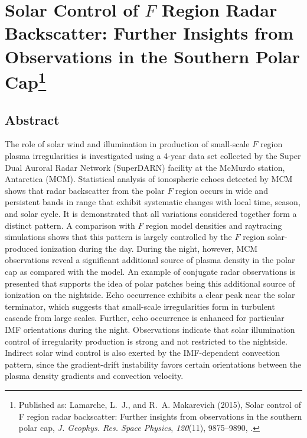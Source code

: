 
\chapter[Solar Control of \(F\) Region Radar Backscatter: Further Insights from Observations in the Southern Polar Cap]{Solar Control of \(F\) Region Radar Backscatter: Further Insights from Observations in the Southern Polar Cap\footnote{Published as: {Lamarche}, L.~J., and R.~A. {Makarevich} (2015), Solar control of {F} region radar backscatter: Further insights from observations in the southern polar cap, \textit{J. Geophys. Res. Space Physics}, \textit{120}(11), 9875--9890, .}}

\label{sec:paper1}



\section*{Abstract}
The role of solar wind and illumination in production of small-scale \(F\) region plasma irregularities is investigated using a 4-year data set collected by the Super Dual Auroral Radar Network (SuperDARN) facility at the McMurdo station, Antarctica (MCM). Statistical analysis of ionospheric echoes detected by MCM shows that radar backscatter from the polar \(F\) region occurs in wide and persistent bands in range that exhibit systematic changes with local time, season, and solar cycle. It is demonstrated that all variations considered together form a distinct pattern. A comparison with \(F\) region model densities and raytracing simulations shows that this pattern is largely controlled by the \(F\) region solar-produced ionization during the day. During the night, however, MCM observations reveal a significant additional source of plasma density in the polar cap as compared with the model. An example of conjugate radar observations is presented that supports the idea of polar patches being this additional source of ionization on the nightside. Echo occurrence exhibits a clear peak near the solar terminator, which suggests that small-scale irregularities form in turbulent cascade from large scales. Further, echo occurrence is enhanced for particular IMF orientations during the night. Observations indicate that solar illumination control of irregularity production is strong and not restricted to the nightside. Indirect solar wind control is also exerted by the IMF-dependent convection pattern, since the gradient-drift instability favors certain orientations between the plasma density gradients and convection velocity.


